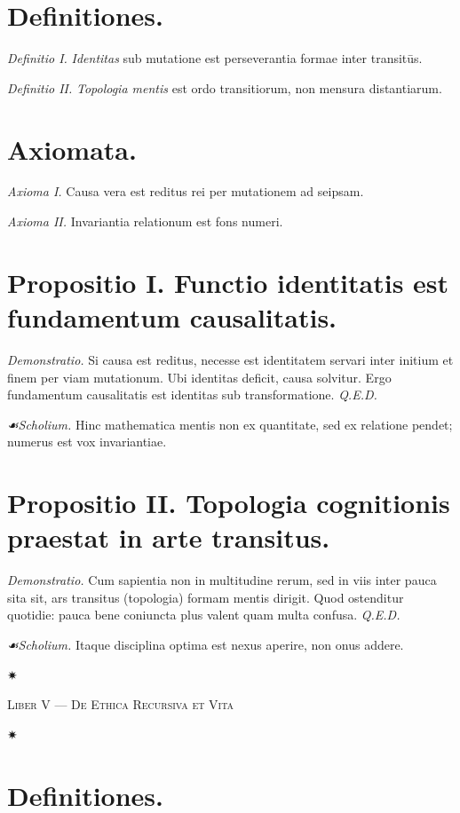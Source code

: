 \documentclass[12pt]{article}
\newcommand{\florale}{\centerline{\large ✷}}
\newcommand{\scholia}{\textit{☙\;}}
\newcommand{\divider}{\vspace{1em}\florale\vspace{1em}}
\newcommand{\Liber}[1]{\vspace{1ex}\begin{center}\Large\textsc{Liber #1}\end{center}\vspace{-0.5ex}\florale\vspace{0.5ex}}
\begin{document}
\section*{Definitiones.}

\textit{Definitio I.} \; \textit{Identitas} sub mutatione est perseverantia formae inter transitūs.

\textit{Definitio II.} \; \textit{Topologia mentis} est ordo transitiorum, non mensura distantiarum.

\section*{Axiomata.}

\textit{Axioma I.} \; Causa vera est reditus rei per mutationem ad seipsam.

\textit{Axioma II.} \; Invariantia relationum est fons numeri.

\section*{Propositio I. \; Functio identitatis est fundamentum causalitatis.}

\textit{Demonstratio.} Si causa est reditus, necesse est identitatem servari inter initium et finem per viam mutationum. Ubi identitas deficit, causa solvitur. Ergo fundamentum causalitatis est identitas sub transformatione. \textit{Q.E.D.}

\textit{\scholia Scholium.} Hinc mathematica mentis non ex quantitate, sed ex relatione pendet; numerus est vox invariantiae.

\section*{Propositio II. \; Topologia cognitionis praestat in arte transitus.}

\textit{Demonstratio.} Cum sapientia non in multitudine rerum, sed in viis inter pauca sita sit, ars transitus (topologia) formam mentis dirigit. Quod ostenditur quotidie: pauca bene coniuncta plus valent quam multa confusa. \textit{Q.E.D.}

\textit{\scholia Scholium.} Itaque disciplina optima est nexus aperire, non onus addere.

\divider

\Liber{V — De Ethica Recursiva et Vita}

\section*{Definitiones.}
\end{document}

